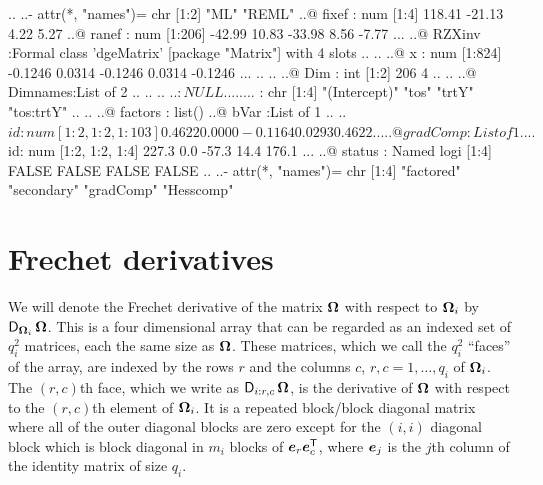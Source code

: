 \documentclass[12pt]{article}
\begin{document}
\begin{Schunk}
\begin{Soutput}
  .. ..- attr(*, "names")= chr [1:2] "ML" "REML"
  ..@ fixef   : num [1:4] 118.41 -21.13   4.22   5.27
  ..@ ranef   : num [1:206] -42.99  10.83 -33.98   8.56  -7.77 ...
  ..@ RZXinv  :Formal class 'dgeMatrix' [package "Matrix"] with 4 slots
  .. .. ..@ x       : num [1:824] -0.1246  0.0314 -0.1246  0.0314 -0.1246 ...
  .. .. ..@ Dim     : int [1:2] 206 4
  .. .. ..@ Dimnames:List of 2
  .. .. .. ..$ : NULL
  .. .. .. ..$ : chr [1:4] "(Intercept)" "tos" "trtY" "tos:trtY"
  .. .. ..@ factors : list()
  ..@ bVar    :List of 1
  .. ..$ id: num [1:2, 1:2, 1:103]  0.4622  0.0000 -0.1164  0.0293  0.4622 ...
  ..@ gradComp:List of 1
  .. ..$ id: num [1:2, 1:2, 1:4] 227.3   0.0 -57.3  14.4 176.1 ...
  ..@ status  : Named logi [1:4] FALSE FALSE FALSE FALSE
  .. ..- attr(*, "names")= chr [1:4] "factored" "secondary" "gradComp" "Hesscomp"
\end{Soutput}
\end{Schunk}

\section{Frechet derivatives}
\label{sec:Frechet}

We will denote the Frechet derivative of the matrix $\bm{\Omega}$ with
respect to $\bm{\Omega}_i$ by $\operatorname{\mathsf{D}}_{\bm{\Omega}_i}\bm{\Omega}$.  This is a four
dimensional array that can be regarded as an indexed set of $q_i^2$
matrices, each the same size as $\bm{\Omega}$.  These matrices, which we
call the $q_i^2$ ``faces'' of the array, are indexed by the rows $r$
and the columns $c$, $r,c=1,\dots,q_i$ of $\bm{\Omega}_i$.  The $(r,c)$th
face, which we write as $\operatorname{\mathsf{D}}_{i:r,c}\bm{\Omega}$, is the derivative of
$\bm{\Omega}$ with respect to the $(r,c)$th element of $\bm{\Omega}_i$. It is
a repeated block/block diagonal matrix where all of the outer diagonal
blocks are zero except for the $(i,i)$ diagonal block which is block
diagonal in $m_i$ blocks of $\bm{e}_r\bm{e}_c^\mathsf{T}$, where $\bm{e}_j$ is
the $j$th column of the identity matrix of size $q_i$.
\end{document}
